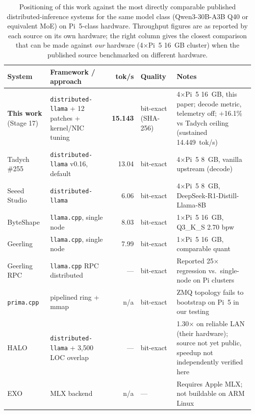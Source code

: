 \documentclass[10pt,a4paper]{article}
\begin{document}
\begin{table}[H]
\centering
\caption{Positioning of this work against the most directly comparable published distributed-inference systems for the same model class (Qwen3-30B-A3B Q40 or equivalent MoE) on Pi~5-class hardware. Throughput figures are as reported by each source on its own hardware; the right column gives the closest comparison that can be made against \emph{our} hardware (4$\times$Pi~5 16~GB cluster) when the published source benchmarked on different hardware.}
\label{tab:related-work}
\small
\setlength{\tabcolsep}{4pt}
\begin{tabularx}{\textwidth}{p{2.5cm}p{3.0cm}r p{1.7cm} X}
\toprule
\textbf{System} & \textbf{Framework / approach} & \textbf{tok/s} & \textbf{Quality} & \textbf{Notes} \\
\midrule
\textbf{This work} (Stage 17) & \texttt{distributed-llama} + 12 patches + kernel/NIC tuning & \textbf{15.143} & bit-exact (SHA-256) & 4$\times$Pi~5 16~GB, this paper; decode metric, telemetry off; $+$16.1\% vs Tadych ceiling (sustained 14.449~tok/s) \\
\midrule
Tadych \#255 \cite{dllama_discussion255} & \texttt{distributed-llama} v0.16, default & 13.04 & bit-exact & 4$\times$Pi~5 8~GB, vanilla upstream (decode) \\
Seeed Studio \cite{seeed2025} & \texttt{distributed-llama} & 6.06 & bit-exact & 4$\times$Pi~5 8~GB, DeepSeek-R1-Distill-Llama-8B \\
ByteShape \cite{byteshape2026} & \texttt{llama.cpp}, single node & 8.03 & bit-exact & 1$\times$Pi~5 16~GB, Q3\_K\_S 2.70 bpw \\
Geerling \cite{geerling_aibench47} & \texttt{llama.cpp}, single node & 7.99 & bit-exact & 1$\times$Pi~5 16~GB, comparable quant \\
Geerling RPC \cite{geerling2025} & \texttt{llama.cpp} RPC distributed & --- & bit-exact & Reported 25$\times$ regression vs.\ single-node on Pi clusters \\
\texttt{prima.cpp} \cite{li2025prima} & pipelined ring + mmap & n/a & bit-exact & ZMQ topology fails to bootstrap on Pi~5 in our testing \\
HALO \cite{halo2026} & \texttt{distributed-llama} + 3{,}500 LOC overlap & --- & bit-exact & 1.30$\times$ on reliable LAN (their hardware); source not yet public, speedup not independently verified here \\
EXO \cite{exo2025} & MLX backend & n/a & --- & Requires Apple MLX; not buildable on ARM Linux \\
\bottomrule
\end{tabularx}
\end{table}
\end{document}
